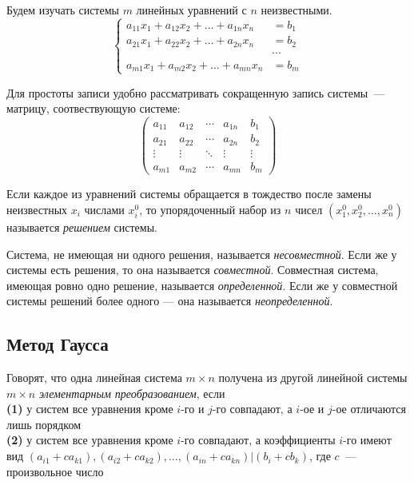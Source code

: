 %
%

Будем изучать системы $m$ линейных уравнений с $n$ неизвестными.
\[\left\{\begin{aligned}
    a_{11} x_1 + a_{12} x_2 + \dots + a_{1n} x_n
&=
    b_1
\\
    a_{21} x_1 + a_{22} x_2 + \dots + a_{2n} x_n
&=
    b_2
\\
    &\cdots
\\
    a_{m1} x_1 + a_{m2} x_2 + \dots + a_{mn} x_n
&=
    b_m
\end{aligned}\right.\]

Для простоты записи удобно рассматривать сокращенную запись системы~---
матрицу, соотвествующую системе:
\[\left(\begin{array}{cccc|c}
    a_{11} & a_{12} & \cdots & a_{1n} & b_1
\\
    a_{21} & a_{22} & \cdots & a_{2n} & b_2
\\
    \vdots & \vdots & \ddots & \vdots & \vdots
\\
    a_{m1} & a_{m2} & \cdots & a_{mn} & b_m
\end{array}\right)\]

Если каждое из уравнений системы обращается в тождество после замены
неизвестных $x_i$ числами $x_i^0$, то упорядоченный набор из $n$ чисел
$(x_1^0, x_2^0, \ldots, x_n^0)$ называется \emph{решением} системы.

Система, не имеющая ни одного решения, называется \emph{несовместной}.
Если же у системы есть решения, то она называется \emph{совместной}.
Совместная система, имеющая ровно одно решение, называется
\emph{определенной}.
Если же у совместной системы решений более одного --- она называется
\emph{неопределенной}.

\subsection*{Метод Гаусса}

Говорят, что одна линейная система $m \times n$ получена из другой линейной
системы $m \times n$ \emph{элементарным преобразованием}, если
\\\textbf{(1)}
у систем все уравнения кроме $i$-го и $j$-го совпадают, а $i$-ое и $j$-ое
отличаются лишь порядком
\\\textbf{(2)}
у систем все уравнения кроме $i$-го совпадают, а коэффициенты $i$-го имеют
вид
\(
    (a_{i1} + c a_{k1}),
    (a_{i2}+c a_{k2}),
    \ldots,
    (a_{in}+c a_{kn})
|
    (b_i+c b_k)
\),
где $c$~--- произвольное число

